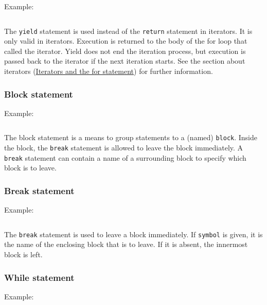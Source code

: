 Example:

\begin{verbatim}
\end{verbatim}

The \texttt{yield} statement is used instead of the \texttt{return}
statement in iterators. It is only valid in iterators. Execution is
returned to the body of the for loop that called the iterator. Yield
does not end the iteration process, but execution is passed back to the
iterator if the next iteration starts. See the section about iterators
(\protect\hyperlink{iterators-and-the-for-statement}{Iterators and the
for statement}) for further information.

\hypertarget{block-statement}{%
\subsubsection{Block statement}\label{block-statement}}

Example:

\begin{verbatim}
\end{verbatim}

The block statement is a means to group statements to a (named)
\texttt{block}. Inside the block, the \texttt{break} statement is
allowed to leave the block immediately. A \texttt{break} statement can
contain a name of a surrounding block to specify which block is to
leave.

\hypertarget{break-statement}{%
\subsubsection{Break statement}\label{break-statement}}

Example:

\begin{verbatim}
\end{verbatim}

The \texttt{break} statement is used to leave a block immediately. If
\texttt{symbol} is given, it is the name of the enclosing block that is
to leave. If it is absent, the innermost block is left.

\hypertarget{while-statement}{%
\subsubsection{While statement}\label{while-statement}}

Example:

\begin{verbatim}
\end{verbatim}

